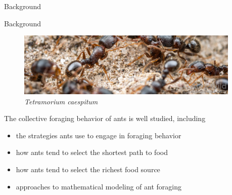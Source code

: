 \begin{subsection}{Background}

\begin{frame}{Background}
\begin{figure}
\begin{columns}%
        \begin{column}{0.8\textwidth}%
            \includegraphics[width=\textwidth,right]{images/caespitum16j-XL}
        \end{column}%
        \begin{column}{0.2\textwidth}%
            \caption{\textit{Tetramorium caespitum} \scriptsize{\cite{alexander_wild_caespitum-16j-xl.jpg_????}}}
        \end{column}%
    \end{columns}
\end{figure}
The collective foraging behavior of ants is well studied, including
\begin{itemize}
	\item the strategies ants use to engage in foraging behavior {\scriptsize\cite{camazine_self-organization_2003}}
    \item how ants tend to select the shortest path to food {\scriptsize\cite{camazine_self-organization_2003}}
    \item how ants tend to select the richest food source {\scriptsize\cite{camazine_self-organization_2003}}
    \item approaches to mathematical modeling of ant foraging  {\scriptsize\cite{perna_individual_2012,ryan_model_2016}}
\end{itemize}

\end{frame}
\end{subsection}
